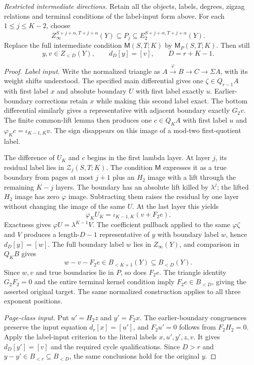 \begin{corollary}
\textit{Restricted intermediate directions.}
Retain all the objects, labels, degrees, zigzag relations and terminal
conditions of the label-input form above.
For each $1\le j\le K-2$, choose
\[
Z_\infty^{S+j+\alpha,T+j+\alpha}(Y)
 \subseteq P_j\subseteq E_2^{S+j+\alpha,T+j+\alpha}(Y).
\]
Replace the full intermediate condition $\mathsf M(S,T;K)$ by
$\mathsf M_P(S,T;K)$. Then still
\[
y,v\in Z_{<D}(Y),\qquad d_D[y]=[v],\qquad D=r+K-1.
\]
\end{corollary}
\begin{proof}
\textit{Label input.}
Write the normalized triangle as $A\xrightarrow\varphi B\to C\to\Sigma A$,
with its weight shifts understood. The specified main differential gives
one $\zeta\in Q_{r-1}A$ with first label $x$ and absolute boundary $U$
with first label exactly $u$. Earlier-boundary corrections retain $x$
while making this second label exact. The bottom differential similarly
gives a representative with adjacent boundary exactly $G_2v$.
The finite common-lift lemma then produces one $c\in Q_KA$ with first
label $u$ and $\varphi_Kc=\iota_{K-1,K}v$. The sign disappears on this
image of a mod-two first-quotient label.

The difference of $U_K$ and $c$ begins in the first lambda layer.
At layer $j$, its residual label lies in $\mathcal Z_j(S,T;K)$.
The condition $\mathsf M$ expresses it as a true boundary from pages
at most $j+1$ plus an $H_2$ image with a lift through the remaining
$K-j$ layers. The boundary has an absolute lift killed by $\lambda^j$;
the lifted $H_2$ image has zero $\varphi$ image. Subtracting them raises
the residual by one layer without changing the image of the same $U$.
At the last layer this yields
\[
\varphi_KU_K=\iota_{K-1,K}(v+F_2e).
\]
Exactness gives $\varphi U=\lambda^{K-1}V$. The coefficient pullback
applied to the same $\varphi\zeta$ and $V$ produces a length-$D-1$
representative of $y$ with boundary label $w$, hence $d_D[y]=[w]$.
The full boundary label $w$ lies in $Z_\infty(Y)$, and comparison in
$Q_KB$ gives
\[
w-v-F_2e\in B_{<K+1}(Y)\subseteq B_{<D}(Y).
\]
Since $w,v$ and true boundaries lie in $P$, so does $F_2e$.
The triangle identity $G_2F_2=0$ and the entire terminal kernel
condition imply $F_2e\in B_{<D}$, giving the asserted original target.
The same normalized construction applies to all three exponent positions.

\textit{Page-class input.}
Put $u'=H_2z$ and $y'=F_2x$. The earlier-boundary congruences preserve
the input equation $d_r[x]=[u']$, and $F_2u'=0$ follows from
$F_2H_2=0$. Apply the label-input criterion to the literal labels
$x,u',y',z,v$. It gives $d_D[y']=[v]$ and the required cycle
qualifications. Since $D>r$ and $y-y'\in B_{<r}\subseteq B_{<D}$,
the same conclusions hold for the original $y$.


\end{proof}
